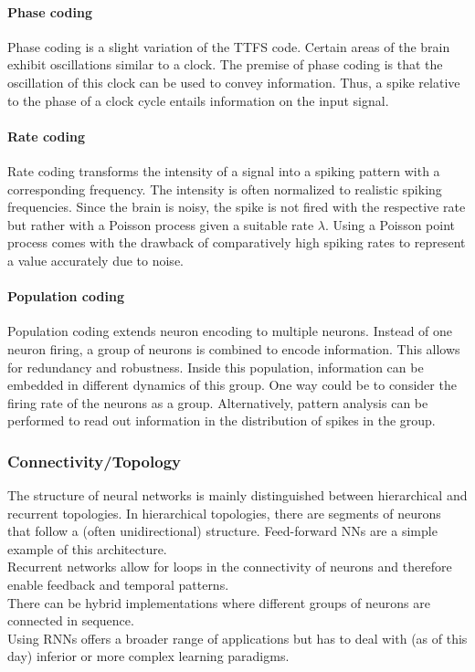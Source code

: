 \paragraph{Phase coding}
Phase coding is a slight variation of the \ac{TTFS} code. Certain areas of the brain exhibit oscillations similar to a clock\cite{jacobs_critical_2013}. The premise of phase coding is that the oscillation of this clock can be used to convey information. Thus, a spike relative to the phase of a clock cycle entails information on the input signal.\\
\paragraph{Rate coding}
Rate coding transforms the intensity of a signal into a spiking pattern with a corresponding frequency. The intensity is often normalized to realistic spiking frequencies. Since the brain is noisy, the spike is not fired with the respective rate but rather with a Poisson process given a suitable rate $\lambda$.
Using a Poisson point process comes with the drawback of comparatively high spiking rates to represent a value accurately due to noise\cite{deneve_efficient_2016}.
\paragraph{Population coding}
Population coding extends neuron encoding to multiple neurons. Instead of one neuron firing, a group of neurons is combined to encode information. This allows for redundancy and robustness. Inside this population, information can be embedded in different dynamics of this group. One way could be to consider the firing rate of the neurons as a group. Alternatively, pattern analysis can be performed to read out information in the distribution of spikes in the group.\\

\subsubsection{Connectivity/Topology}
The structure of neural networks is mainly distinguished between hierarchical and recurrent topologies. In hierarchical topologies, there are segments of neurons that follow a (often unidirectional) structure. Feed-forward \acp{NN} are a simple example of this architecture.\\
Recurrent networks allow for loops in the connectivity of neurons and therefore enable feedback and temporal patterns.\\
There can be hybrid implementations where different groups of neurons are connected in sequence.\\
Using \acp{RNN} offers a broader range of applications but has to deal with (as of this day) inferior or more complex learning paradigms.\\

